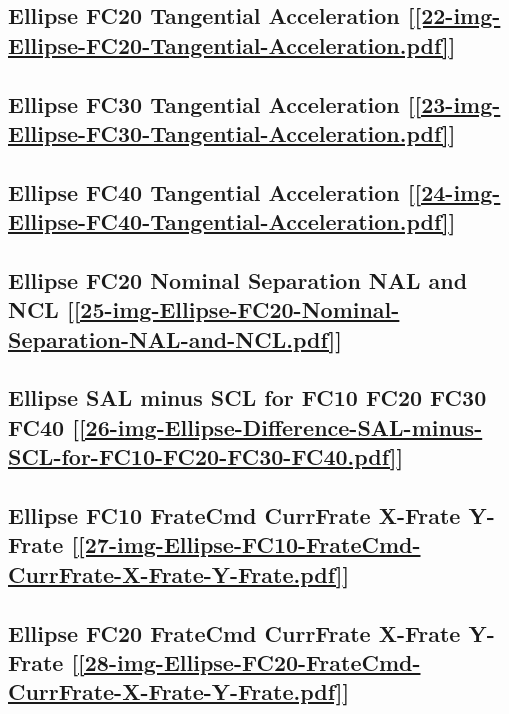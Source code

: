 \subsection       {Ellipse FC20 Tangential Acceleration
[\ref      {22-img-Ellipse-FC20-Tangential-Acceleration.pdf}] }
\label{ssec-22-img-Ellipse-FC20-Tangential-Acceleration.pdf}

\subsection       {Ellipse FC30 Tangential Acceleration
[\ref      {23-img-Ellipse-FC30-Tangential-Acceleration.pdf}] }
\label{ssec-23-img-Ellipse-FC30-Tangential-Acceleration.pdf}

\subsection       {Ellipse FC40 Tangential Acceleration
[\ref      {24-img-Ellipse-FC40-Tangential-Acceleration.pdf}] }
\label{ssec-24-img-Ellipse-FC40-Tangential-Acceleration.pdf}

\subsection       {Ellipse FC20 Nominal Separation NAL and NCL
[\ref      {25-img-Ellipse-FC20-Nominal-Separation-NAL-and-NCL.pdf}] }
\label{ssec-25-img-Ellipse-FC20-Nominal-Separation-NAL-and-NCL.pdf}

\subsection       {Ellipse SAL minus SCL for FC10 FC20 FC30 FC40
[\ref      {26-img-Ellipse-Difference-SAL-minus-SCL-for-FC10-FC20-FC30-FC40.pdf}] }
\label{ssec-26-img-Ellipse-Difference-SAL-minus-SCL-for-FC10-FC20-FC30-FC40.pdf}


\subsection       {Ellipse FC10 FrateCmd CurrFrate X-Frate Y-Frate
[\ref      {27-img-Ellipse-FC10-FrateCmd-CurrFrate-X-Frate-Y-Frate.pdf}] }
\label{ssec-27-img-Ellipse-FC10-FrateCmd-CurrFrate-X-Frate-Y-Frate.pdf}

\subsection       {Ellipse FC20 FrateCmd CurrFrate X-Frate Y-Frate
[\ref      {28-img-Ellipse-FC20-FrateCmd-CurrFrate-X-Frate-Y-Frate.pdf}] }
\label{ssec-28-img-Ellipse-FC20-FrateCmd-CurrFrate-X-Frate-Y-Frate.pdf}

